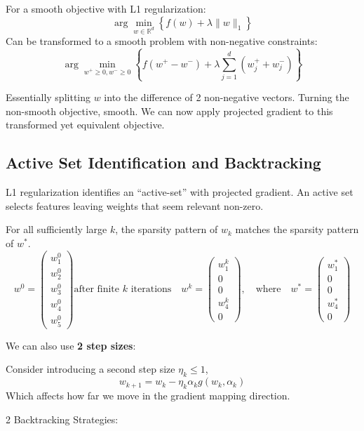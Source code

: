 \documentclass[
]{article}
\begin{document}
For a smooth objective with L1 regularization:
\[
\arg \min_{w \in \mathbb{R}^d} \left\{ f(w) + \lambda \| w \|_1 \right\}
\]
Can be transformed to a smooth problem with non-negative constraints:
\[
\arg \min_{w^+ \geq 0, w^- \geq 0} \left\{ f(w^+ - w^-) + \lambda \sum_{j=1}^d (w^+_j + w^-_j) \right\}
\]

Essentially splitting \(w\) into the difference of 2 non-negative vectors. Turning the non-smooth objective, smooth. We can now apply projected gradient to this transformed yet equivalent objective.

\subsection{Active Set Identification and Backtracking}\label{active-set-identification-and-backtracking}

L1 regularization identifies an ``active-set'' with projected gradient. An active set selects features leaving weights that seem relevant non-zero.

For all sufficiently large \(k\), the sparsity pattern of \(w_k\) matches the sparsity pattern of \(w^*\).
\[
w^0 = 
\begin{pmatrix}
w^0_1 \\
w^0_2 \\
w^0_3 \\
w^0_4 \\
w^0_5 
\end{pmatrix}
\text{after finite } k \text{ iterations} \quad
w^k = 
\begin{pmatrix}
w^k_1 \\
0 \\
0 \\
w^k_4 \\
0 
\end{pmatrix},
\quad \text{where} \quad
w^* = 
\begin{pmatrix}
w^*_1 \\
0 \\
0 \\
w^*_4 \\
0 
\end{pmatrix}
\]

We can also use \textbf{2 step sizes}:

Consider introducing a second step size \(\eta_k \leq 1\),
\[
w_{k+1} = w_k - \eta_k \alpha_k g(w_k, \alpha_k)
\]
Which affects how far we move in the gradient mapping direction.

2 Backtracking Strategies:
\end{document}
